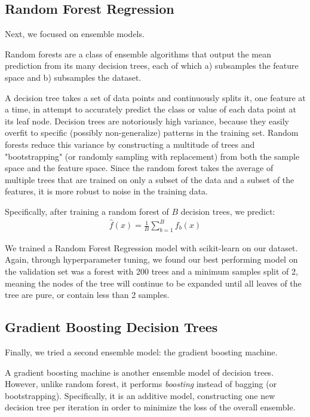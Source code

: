 \documentclass[journal]{IEEEtran}
\begin{document}
\subsection{Random Forest Regression}
Next, we focused on ensemble models.

Random forests are a class of ensemble algorithms that output the mean prediction from its many decision trees, each of which a) subsamples the feature space and b) subsamples the dataset.

A decision tree takes a set of data points and continuously splits it, one feature at a time, in attempt to accurately predict the class or value of each data point at its leaf node. Decision trees are notoriously high variance, because they easily overfit to specific (possibly non-generalize) patterns in the training set. Random forests reduce this variance by constructing a multitude of trees and "bootstrapping" (or randomly sampling with replacement) from both the sample space and the feature space. Since the random forest takes the average of multiple trees that are trained on only a subset of the data and a subset of the features, it is more robust to noise in the training data.

Specifically, after training a random forest of $B$ decision trees, we predict: \begin{align*}
    \hat{f}(x) = \frac{1}{B}\sum_{b=1}^{B} f_b(x)
\end{align*}

We trained a Random Forest Regression model with scikit-learn on our dataset. Again, through hyperparameter tuning, we found our best performing model on the validation set was a forest with 200 trees and a minimum samples split of 2, meaning the nodes of the tree will continue to be expanded until all leaves of the tree are pure, or contain less than 2 samples.

\subsection{Gradient Boosting Decision Trees}
Finally, we tried a second ensemble model: the gradient boosting machine.

A gradient boosting machine is another ensemble model of decision trees. However, unlike random forest, it performs \textit{boosting} instead of bagging (or bootstrapping). Specifically, it is an additive model, constructing one new decision tree per iteration in order to minimize the loss of the overall ensemble.
\end{document}
